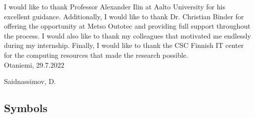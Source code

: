 \documentclass[english, 12pt, a4paper, elec, utf8, a-1b, online]{aaltothesis}
\begin{document}
I would like to thank Professor Alexander Ilin at Aalto University for his excellent guidance. Additionally, I would like to thank Dr. Christian Binder for offering the opportunity at Metso Outotec and providing full support throughout the process. I would also like to thank my colleagues that motivated me endlessly during my internship. Finally, I would like to thank the CSC Finnish IT center for the computing resources that made the research possible. \\

\vspace{5cm}
Otaniemi, 29.7.2022

\vspace{5mm}
{\hfill Saidnassimov, D.\hspace{1cm}}

\newpage


\thesistableofcontents

\cleardoublepage
\listoffigures
\cleardoublepage

\listoftables
\cleardoublepage


\subsection*{Symbols}
\end{document}
